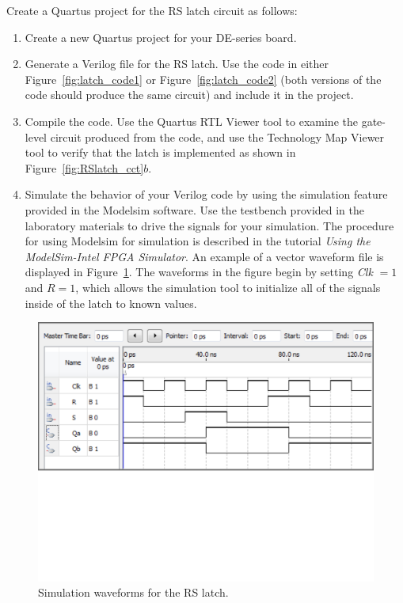 \documentclass[epsfig,10pt,fullpage]{article}
\begin{document}
Create a Quartus project for the RS latch circuit as follows:
\begin{enumerate}
\item Create a new Quartus project for your DE-series board.
\item Generate a Verilog file for the RS latch. Use the code in either Figure~\ref{fig:latch_code1} or
Figure~\ref{fig:latch_code2}
(both versions of the code should produce the same circuit) and include it in the project. 
\item Compile the code. Use the Quartus RTL Viewer tool to examine the gate-level
circuit produced from the code, and use the Technology Map Viewer tool 
to verify that the latch is implemented as shown in Figure~\ref{fig:RSlatch_cct}$b$.
\item Simulate the behavior of your Verilog code by using the simulation feature provided
in the Modelsim software. Use the testbench provided in the laboratory materials to drive
the signals for your simulation. The procedure for using Modelsim for simulation is
described in the tutorial {\it Using the ModelSim-Intel FPGA Simulator}. An example of a
vector waveform file is displayed in Figure~\ref{fig:sim}. The waveforms in the figure
begin by setting {\it Clk} $= 1$ and $R = 1$, which allows the simulation tool to
initialize all of the signals inside of the latch to known values. 
\end{enumerate}

\begin{figure}[H]
	\begin{center}
		\includegraphics[width = 5in]{figures/simulation.pdf}
	\end{center}
	\caption{Simulation waveforms for the RS latch.}
\label{fig:sim}
\end{figure}
\end{document}
